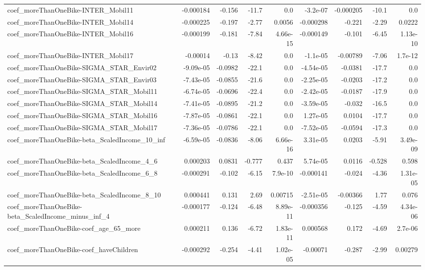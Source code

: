 \begin{tabular}{lrrrrrrrr}
coef_moreThanOneBike-INTER_Mobil11 & -0.000184 & -0.156 & -11.7 & 0.0 & -3.2e-07 & -0.000205 & -10.1 & 0.0 \\
coef_moreThanOneBike-INTER_Mobil14 & -0.000225 & -0.197 & -2.77 & 0.0056 & -0.000298 & -0.221 & -2.29 & 0.0222 \\
coef_moreThanOneBike-INTER_Mobil16 & -0.000199 & -0.181 & -7.84 & 4.66e-15 & -0.000149 & -0.101 & -6.45 & 1.13e-10 \\
coef_moreThanOneBike-INTER_Mobil17 & -0.00014 & -0.13 & -8.42 & 0.0 & -1.1e-05 & -0.00789 & -7.06 & 1.7e-12 \\
coef_moreThanOneBike-SIGMA_STAR_Envir02 & -9.09e-05 & -0.0982 & -22.1 & 0.0 & -4.54e-05 & -0.0381 & -17.7 & 0.0 \\
coef_moreThanOneBike-SIGMA_STAR_Envir03 & -7.43e-05 & -0.0855 & -21.6 & 0.0 & -2.25e-05 & -0.0203 & -17.2 & 0.0 \\
coef_moreThanOneBike-SIGMA_STAR_Mobil11 & -6.74e-05 & -0.0696 & -22.4 & 0.0 & -2.42e-05 & -0.0187 & -17.9 & 0.0 \\
coef_moreThanOneBike-SIGMA_STAR_Mobil14 & -7.41e-05 & -0.0895 & -21.2 & 0.0 & -3.59e-05 & -0.032 & -16.5 & 0.0 \\
coef_moreThanOneBike-SIGMA_STAR_Mobil16 & -7.87e-05 & -0.0861 & -22.1 & 0.0 & 1.27e-05 & 0.0104 & -17.7 & 0.0 \\
coef_moreThanOneBike-SIGMA_STAR_Mobil17 & -7.36e-05 & -0.0786 & -22.1 & 0.0 & -7.52e-05 & -0.0594 & -17.3 & 0.0 \\
coef_moreThanOneBike-beta_ScaledIncome_10_inf & -6.59e-05 & -0.0836 & -8.06 & 6.66e-16 & 3.31e-05 & 0.0203 & -5.91 & 3.49e-09 \\
coef_moreThanOneBike-beta_ScaledIncome_4_6 & 0.000203 & 0.0831 & -0.777 & 0.437 & 5.74e-05 & 0.0116 & -0.528 & 0.598 \\
coef_moreThanOneBike-beta_ScaledIncome_6_8 & -0.000291 & -0.102 & -6.15 & 7.9e-10 & -0.000141 & -0.024 & -4.36 & 1.31e-05 \\
coef_moreThanOneBike-beta_ScaledIncome_8_10 & 0.000441 & 0.131 & 2.69 & 0.00715 & -2.51e-05 & -0.00366 & 1.77 & 0.076 \\
coef_moreThanOneBike-beta_ScaledIncome_minus_inf_4 & -0.000177 & -0.124 & -6.48 & 8.89e-11 & -0.000356 & -0.125 & -4.59 & 4.34e-06 \\
coef_moreThanOneBike-coef_age_65_more & 0.000211 & 0.136 & -6.72 & 1.83e-11 & 0.000568 & 0.172 & -4.69 & 2.7e-06 \\
coef_moreThanOneBike-coef_haveChildren & -0.000292 & -0.254 & -4.41 & 1.02e-05 & -0.00071 & -0.287 & -2.99 & 0.00279 \\

\end{tabular}
